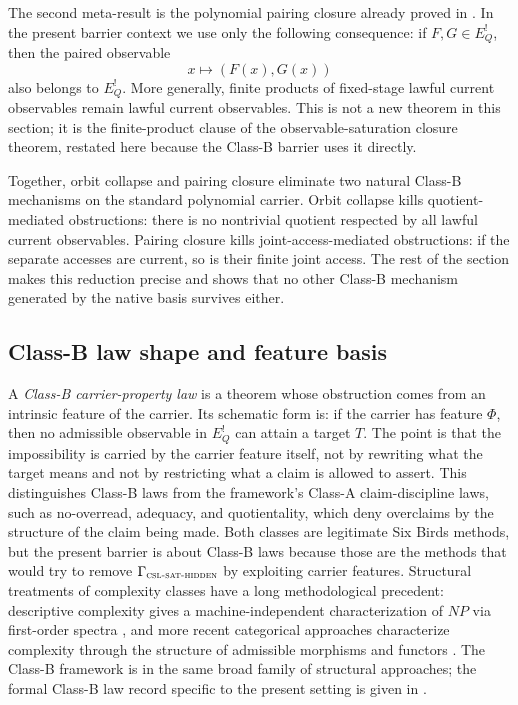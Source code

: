\documentclass[11pt]{article}
\newcommand{\EQbang}{E^{!}_{Q}}
\newcommand{\CSLSATHidden}{\Gamma_{\textsc{csl-sat-hidden}}}
\theoremstyle{definition}
\begin{document}
The second meta-result is the polynomial pairing closure already proved
in .  In the present barrier
context we use only the following consequence: if \(F,G\in\EQbang\),
then the paired observable
\[
  x\longmapsto (F(x),G(x))
\]
also belongs to \(\EQbang\).  More generally, finite products of
fixed-stage lawful current observables remain lawful current
observables.  This is not a new theorem in this section; it is the
finite-product clause of the observable-saturation closure theorem,
restated here because the Class-B barrier uses it directly.

Together, orbit collapse and pairing closure eliminate two natural
Class-B mechanisms on the standard polynomial carrier.  Orbit collapse
kills quotient-mediated obstructions: there is no nontrivial quotient
respected by all lawful current observables.  Pairing closure kills
joint-access-mediated obstructions: if the separate accesses are
current, so is their finite joint access.  The rest of the section
makes this reduction precise and shows that no other Class-B mechanism
generated by the native basis survives either.

\subsection{Class-B law shape and feature basis}
\label{subsec:class-b:shape-and-basis}

A \emph{Class-B carrier-property law} is a theorem whose obstruction
comes from an intrinsic feature of the carrier.  Its schematic form is:
if the carrier has feature \(\Phi\), then no admissible observable in
\(\EQbang\) can attain a target \(T\).  The point is that the
impossibility is carried by the carrier feature itself, not by rewriting
what the target means and not by restricting what a claim is allowed to
assert.  This distinguishes Class-B laws from the framework's Class-A
claim-discipline laws, such as no-overread, adequacy, and quotientality,
which deny overclaims by the structure of the claim being made.  Both
classes are legitimate Six Birds methods, but the present barrier is
about Class-B laws because those are the methods that would try to
remove \(\CSLSATHidden\) by exploiting carrier features.  Structural
treatments of complexity classes have a long methodological precedent:
descriptive complexity gives a machine-independent characterization of
\(NP\) via first-order spectra
\citep{Fagin1974GeneralizedSpectra,Immerman1999DescriptiveComplexity},
and more recent categorical approaches characterize complexity through
the structure of admissible morphisms and functors
\citep{BasuIsik2020CategoricalComplexity}.  The Class-B framework is in
the same broad family of structural approaches; the formal Class-B law
record specific to the present setting is given in
.
\end{document}
